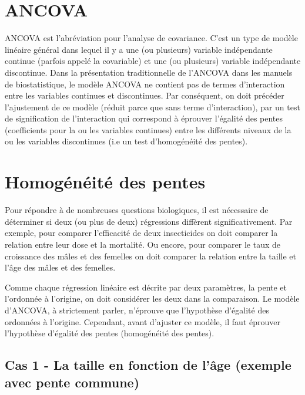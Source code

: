 \documentclass[
  12pt,
]{book}
\begin{document}
\hypertarget{ancova}{%
\section{ANCOVA}\label{ancova}}

ANCOVA est l'abréviation pour l'analyse de covariance. C'est un type de modèle linéaire général dans lequel il y a une (ou plusieurs) variable indépendante continue (parfois appelé la covariable) et une (ou plusieurs) variable indépendante discontinue. Dans la présentation traditionnelle de l'ANCOVA dans les manuels de biostatistique, le modèle ANCOVA ne contient pas de termes d'interaction entre les variables continues et discontinues. Par conséquent, on doit précéder l'ajustement de ce modèle (réduit parce que sans terme d'interaction), par un test de signification de l'interaction qui correspond à éprouver l'égalité des pentes (coefficients pour la ou les variables continues) entre les différents niveaux de la ou les variables discontinues (i.e un test d'homogénéité des pentes).

\hypertarget{homoguxe9nuxe9ituxe9-des-pentes}{%
\section{Homogénéité des pentes}\label{homoguxe9nuxe9ituxe9-des-pentes}}

Pour répondre à de nombreuses questions biologiques, il est nécessaire de déterminer si deux (ou plus de deux) régressions diffèrent significativement. Par exemple, pour comparer l'efficacité de deux insecticides on doit comparer la relation entre leur dose et la mortalité. Ou encore, pour comparer le taux de croissance des mâles et des femelles on doit comparer la relation entre la taille et l'âge des mâles et des femelles.

Comme chaque régression linéaire est décrite par deux paramètres, la pente et l'ordonnée à l'origine, on doit considérer les deux dans la comparaison. Le modèle d'ANCOVA, à strictement parler, n'éprouve que l'hypothèse d'égalité des ordonnées à l'origine. Cependant, avant d'ajuster ce modèle, il faut éprouver l'hypothèse d'égalité des pentes (homogénéité des pentes).

\hypertarget{cas-1---la-taille-en-fonction-de-luxe2ge-exemple-avec-pente-commune}{%
\subsection{Cas 1 - La taille en fonction de l'âge (exemple avec pente commune)}\label{cas-1---la-taille-en-fonction-de-luxe2ge-exemple-avec-pente-commune}}
\end{document}
